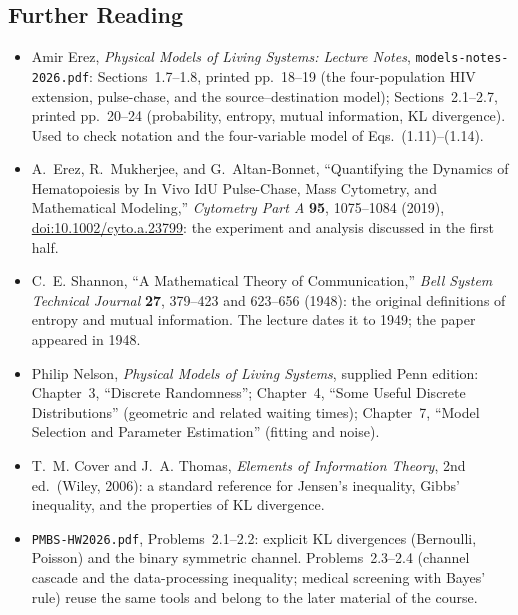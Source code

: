 \subsection*{Further Reading}
\begingroup\small
\begin{itemize}
\item Amir Erez, \emph{Physical Models of Living Systems: Lecture Notes}, \texttt{models-notes-2026.pdf}: Sections~1.7--1.8, printed pp.~18--19 (the four-population HIV extension, pulse-chase, and the source--destination model); Sections~2.1--2.7, printed pp.~20--24 (probability, entropy, mutual information, KL divergence). Used to check notation and the four-variable model of Eqs.~(1.11)--(1.14).
\item A.~Erez, R.~Mukherjee, and G.~Altan-Bonnet, ``Quantifying the Dynamics of Hematopoiesis by In Vivo IdU Pulse-Chase, Mass Cytometry, and Mathematical Modeling,'' \emph{Cytometry Part A} \textbf{95}, 1075--1084 (2019), \href{https://doi.org/10.1002/cyto.a.23799}{doi:10.1002/cyto.a.23799}: the experiment and analysis discussed in the first half.
\item C.~E. Shannon, ``A Mathematical Theory of Communication,'' \emph{Bell System Technical Journal} \textbf{27}, 379--423 and 623--656 (1948): the original definitions of entropy and mutual information. The lecture dates it to 1949; the paper appeared in 1948.
\item Philip Nelson, \emph{Physical Models of Living Systems}, supplied Penn edition: Chapter~3, ``Discrete Randomness''; Chapter~4, ``Some Useful Discrete Distributions'' (geometric and related waiting times); Chapter~7, ``Model Selection and Parameter Estimation'' (fitting and noise).
\item T.~M. Cover and J.~A. Thomas, \emph{Elements of Information Theory}, 2nd ed.\ (Wiley, 2006): a standard reference for Jensen's inequality, Gibbs' inequality, and the properties of KL divergence.
\item \texttt{PMBS-HW2026.pdf}, Problems~2.1--2.2: explicit KL divergences (Bernoulli, Poisson) and the binary symmetric channel. Problems~2.3--2.4 (channel cascade and the data-processing inequality; medical screening with Bayes' rule) reuse the same tools and belong to the later material of the course.
\end{itemize}
\endgroup
